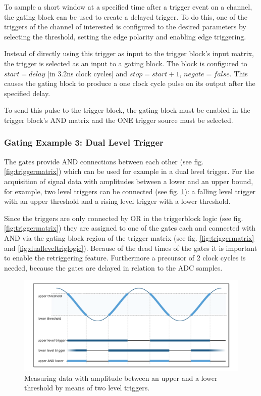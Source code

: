 			To sample a short window at a specified time after a trigger event on a channel, the gating block can be used to create a delayed trigger. To do this, one of the triggers of the channel of interested is configured to the desired parameters by selecting the threshold, setting the edge polarity and 
enabling edge triggering.\par

			Instead of directly using this trigger as input to the trigger block's input matrix, the trigger is selected as an input to a gating block. The block is configured to $start = delay$ [in 3.2ns clock cycles] 
and $stop = start+1$, $negate = false$. This causes the gating block to produce a one clock cycle pulse on its output after the specified delay.\par

			To send this pulse to the trigger block, the gating block must be enabled in the trigger block's AND matrix and the ONE trigger source must be selected. 
			
		\subsubsection{Gating Example 3: Dual Level Trigger}
		
			The gates provide AND connections between each other (see fig. \ref{fig:triggermatrix}) which can be used for example in a dual level trigger. For the acquisition of signal data with amplitudes between a lower and an upper bound, for example, two level triggers can be connected (see fig. \ref{fig:dualleveltrig}): a falling level trigger with an upper threshold and a rising level trigger with a lower threshold.\par
			Since the triggers are only connected by OR in the triggerblock logic (see fig. \ref{fig:triggermatrix}) they are assigned to one of the gates each and connected with AND via the gating block region of the trigger matrix (see fig. \ref{fig:triggermatrix} and \ref{fig:dualleveltriglogic}). Because of the dead times of the gates it is important to enable the retriggering feature. Furthermore a precursor of 2 clock cycles is needed, because the gates are delayed in relation to the ADC samples.\par
			\begin{figure}[ht]
				\begin{center}
					\includegraphics[width=\textwidth]{figures/dual_level_triggering.pdf}
					\caption{\label{fig:dualleveltrig}Measuring data with amplitude between an upper and a lower threshold by means of two level triggers.}
				\end{center}
			\end{figure}	
			
